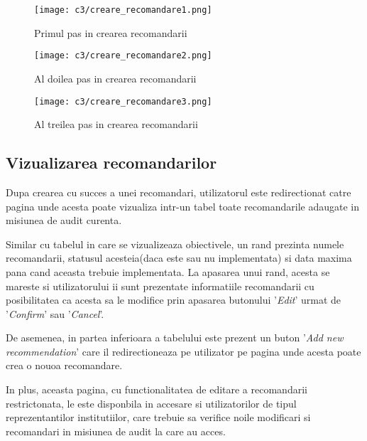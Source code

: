 \newpage
\vspace{1cm}
\begin{figure}[h]
	\centering
	
	\texttt{[image: c3/creare\_recomandare1.png]}
	\caption{Primul pas in crearea recomandarii}
\end{figure}

\vspace{1cm}
\begin{figure}[h]
	\centering
	
	\texttt{[image: c3/creare\_recomandare2.png]}
	\caption{Al doilea pas in crearea recomandarii}
\end{figure}

\vspace{1cm}
\begin{figure}[h]
	\centering
	
	\texttt{[image: c3/creare\_recomandare3.png]}
	\caption{Al treilea pas in crearea recomandarii}
\end{figure}

\newpage
\subsection*{Vizualizarea recomandarilor}

Dupa crearea cu succes a unei recomandari, utilizatorul este redirectionat catre pagina unde acesta poate vizualiza intr-un tabel toate recomandarile adaugate in misiunea de audit curenta.

Similar cu tabelul in care se vizualizeaza obiectivele, un rand prezinta numele recomandarii, statusul acesteia(daca este sau nu implementata) si data maxima pana cand aceasta trebuie implementata. La apasarea unui rand, acesta se mareste si utilizatorului ii sunt prezentate informatiile recomandarii cu posibilitatea ca acesta sa le modifice prin apasarea butonului '\textit{Edit}' urmat de '\textit{Confirm}' sau '\textit{Cancel}'.

De asemenea, in partea inferioara a tabelului este prezent un buton '\textit{Add new recommendation}' care il redirectioneaza pe utilizator pe pagina unde acesta poate crea o nouoa recomandare.

In plus, aceasta pagina, cu functionalitatea de editare a recomandarii restrictonata, le este disponbila in accesare si utilizatorilor de tipul reprezentantilor institutiilor, care trebuie sa verifice noile modificari si recomandari in misiunea de audit la care au acces.\\

